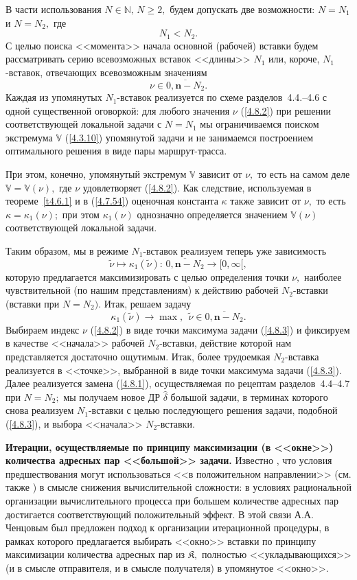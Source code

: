 \documentclass[11pt,twoside,openany]{report}
\newcommand{\bfn}{\begin{equation}}
\newcommand{\efn}{\end{equation}}
\newcommand{\ov}{\overline}
\newcommand{\bbn}{{\mathbb N}}
\newcommand{\bbv}{{\mathbb V}}
\newcommand{\nn}{{\mathbf n}}
\begin{document}
{{В части использования $N\in \bbn,\,N\geqslant 2,$ будем допускать две возможности: $N=N_1$ и $N=N_2,$ где
$$N_1 < N_2.$$
С целью поиска <<момента>> начала основной (рабочей) вставки будем рассматривать серию
всевозможных вставок <<длины>> $N_1$  или, короче, $N_1$-вставок, отвечающих всевозможным значениям
\bfn\label{4.8.2}\nu\in \ov{0,\nn-N_2}.\efn
Каждая из упомянутых $N_1$-вставок реализуется по схеме разделов~4.4.--4.6 с одной существенной оговоркой:
для любого значения $\nu$ (\ref{4.8.2}) при решении соответствующей локальной задачи с $N=N_1$ мы
ограничиваемся поиском экстремума $\bbv$ (\ref{4.3.10}) упомянутой задачи и не занимаемся построением
оптимального решения в виде пары маршрут-трасса.

При этом, конечно, упомянутый экстремум $\bbv$ зависит от $\nu,$ то есть на самом деле $\bbv = \bbv(\nu),$
где $\nu$ удовлетворяет (\ref{4.8.2}). Как следствие, используемая в теореме~\ref{t4.6.1} и в (\ref{4.7.54})
оценочная константа $\kappa$ также зависит от $\nu,$ то есть $\kappa = \kappa_1(\nu);$ при этом $\kappa_1(\nu)$
однозначно определяется значением $\bbv(\nu)$ соответствующей локальной задачи.

Таким образом, мы в режиме $N_1$-вставок реализуем теперь уже зависимость
$$\tilde{\nu}\longmapsto \kappa_1(\tilde{\nu}):\,\ov{0,\nn-N_2}\longrightarrow [0,\infty[,
$$
которую предлагается максимизировать с целью определения точки $\nu,$ наиболее чувствительной (по нашим
представлениям) к действию рабочей $N_2$-вставки (вставки при $N=N_2).$ Итак, решаем задачу
\bfn\label{4.8.3}\kappa_1(\tilde{\nu}) \longrightarrow \max,\ \ \tilde{\nu}\in\ov{0,\nn-N_2}.
\efn
Выбираем индекс $\nu$ (\ref{4.8.2}) в виде точки максимума задачи (\ref{4.8.3}) и фиксируем в качестве
<<начала>> рабочей $N_2$-вставки, действие которой нам представляется достаточно ощутимым.
Итак, более трудоемкая $N_2$-вставка реализуется в <<точке>>, выбранной в виде точки максимума
задачи (\ref{4.8.3}). Далее реализуется замена (\ref{4.8.1}), осуществляемая по рецептам
разделов~4.4--4.7 при $N=N_2;$ мы получаем новое ДР $\hat{\delta}$ большой задачи, в терминах
которого снова реализуем $N_1$-вставки с целью последующего решения задачи, подобной (\ref{4.8.3}),
и выбора <<начала>> $N_2$-вставки.

{\bf Итерации, осуществляемые по принципу максимизации (в <<окне>>) количества адресных пар
<<большой>> задачи.}  Известно \cite[\S\,4.9]{Cha1`}, что условия предшествования могут использоваться
<<в положительном направлении>> (см. также \cite[гл.~4]{Cha2`}) в смысле снижения вычислительной сложности:
в условиях рациональной организации вычислительного процесса при большем количестве адресных пар
достигается соответствующий положительный эффект. В этой связи А.А. Ченцовым был предложен подход
к организации итерационной процедуры, в рамках которого предлагается выбирать <<окно>> вставки по
принципу максимизации количества адресных пар из $\mathfrak{K},$ полностью <<укладывающихся>> (и в
смысле отправителя, и в смысле получателя) в упомянутое <<окно>>.


}}
\end{document}
